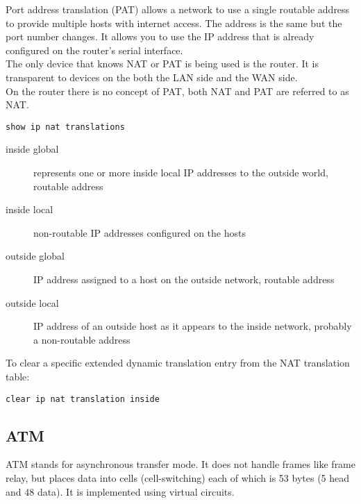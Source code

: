Port address translation (PAT) allows a network to use a single routable
address to provide multiple hosts with internet access. The address is the
same but the port number changes. It allows you to use the IP address that is
already configured on the router's serial interface.\\

The only device that knows NAT or PAT is being used is the router. It
is transparent to devices on the both the LAN side and the WAN side.\\

On the router there is no concept of PAT, both NAT and PAT are referred to
as NAT.

\begin{verbatim}
show ip nat translations
\end{verbatim}

\begin{description}

\item[inside global]
represents one or more inside local IP addresses to the outside world, routable
address

\item[inside local]
non-routable IP addresses configured on the hosts

\item[outside global]
IP address assigned to a host on the outside network, routable address

\item[outside local]
IP address of an outside host as it appears to the inside network, probably
a non-routable address

\end{description}

To clear a specific extended dynamic translation entry from the NAT translation
table:\\

\begin{verbatim}
clear ip nat translation inside
\end{verbatim}

\subsection{ATM}

ATM stands for asynchronous transfer mode. It does not handle frames like
frame relay, but places data into cells (cell-switching) each of which is 53
bytes (5 head and 48 data). It is implemented using virtual circuits.\\

